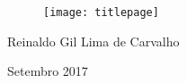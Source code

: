 \thispagestyle{empty}

\begin{center}
  \begin{figure}[H]
    \begin{center}
      \hspace{-1cm}
      \texttt{[image: titlepage]}
  ~\cite{FrontPageIMG}
    \end{center}      
  \end{figure}

  \vskip 2cm

  \hspace{-1cm}
  \begin{minipage}[c]{17cm}
    \begin{center}

{\huge {}\vskip 0.15cm %

{\large Reinaldo Gil Lima de Carvalho} %
}
    \end{center}
  \end{minipage}

  \vskip 14cm

  {\huge Setembro 2017} %

\end{center}
